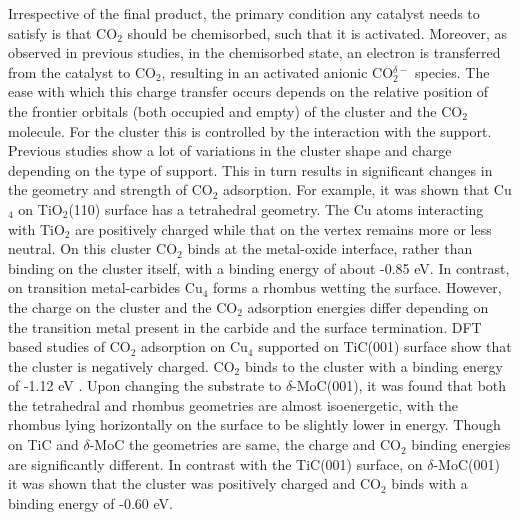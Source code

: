  Irrespective of the final product, the primary condition any catalyst needs to satisfy is that
 CO$_2$ should be chemisorbed, such that it is activated. Moreover, as observed in previous
 studies, in the chemisorbed state, an electron is transferred from the catalyst to CO$_2$, 
 resulting in an activated anionic CO$_2^{\delta -}$ species\cite{mxene-co2, freund}. The ease with which
 this charge transfer occurs depends on the relative position of the frontier orbitals (both occupied
 and empty) of the cluster and the CO$_2$ molecule. For the cluster this is controlled by the interaction
 with the support. Previous studies show a lot of variations in the cluster shape and charge depending on the type
 of support. This in turn results in significant changes in the
 geometry and strength of CO$_2$ adsorption. For example, it was
 shown that Cu$_4$ on TiO$_2$(110) surface has a tetrahedral geometry\cite{tao2019best}.
  The Cu atoms interacting with TiO$_2$ are positively charged while that on the vertex remains more or less
 neutral. On this cluster CO$_2$ binds at the metal-oxide interface, rather than binding
 on the cluster itself, with a binding energy of about -0.85 eV. In contrast, on transition metal-carbides Cu$_4$ forms a rhombus wetting the surface. However, the charge on the cluster and the
 CO$_2$ adsorption energies differ depending on the transition metal present in the carbide and the surface
 termination. DFT based studies of CO$_2$ adsorption
 on Cu$_4$ supported on TiC(001) surface show that the cluster is negatively charged. CO$_2$ binds to the cluster
 with a binding energy of -1.12 eV \cite{vidal2012co2}.
 Upon changing the substrate to 
 $\delta$-MoC(001), it was found that both the tetrahedral and rhombus geometries are almost isoenergetic, with the
 rhombus lying horizontally on the surface to be slightly lower in energy. Though on TiC and $\delta$-MoC the geometries are same, the charge and CO$_2$ binding energies are significantly different. In contrast with the TiC(001) surface, on $\delta$-MoC(001) it was shown that  the cluster was positively charged and CO$_2$ binds with a binding energy of -0.60 eV\cite{posada2016highly}.

